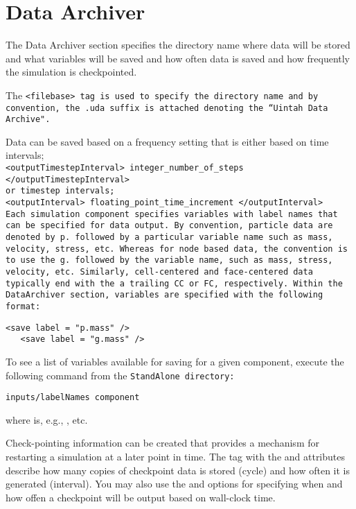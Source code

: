 \section{Data Archiver} \label{Sec:DataArchiver}

The Data Archiver section specifies the directory name where data will
be stored and what variables will be saved and how often data is saved
and how frequently the simulation is checkpointed.

The \tt <filebase> \normalfont tag is used to specify the directory
name and by convention, the \tt .uda \normalfont suffix is attached denoting the
``Uintah Data Archive".

Data can be saved based on a frequency setting that is either based on time
intervals;\\
\tt <outputTimestepInterval> integer\_number\_of\_steps </outputTimestepInterval> \normalfont\\
or timestep intervals; \\
\tt <outputInterval> floating\_point\_time\_increment </outputInterval> \normalfont\\

Each simulation component specifies variables with label names that
can be specified for data output.  By convention, particle data are
denoted by \tt p. \normalfont followed by a particular variable name
such as mass, velocity, stress, etc.  Whereas for node based data, the
convention is to use the \tt g. \normalfont followed by the variable
name, such as mass, stress, velocity, etc.  Similarly, cell-centered
and face-centered data typically end with the a trailing \tt CC \normalfont
or \tt FC, \normalfont  respectively.  Within the DataArchiver
section, variables are specified with the following format:

\begin{Verbatim}[fontsize=\footnotesize]
   <save label = "p.mass" />
   <save label = "g.mass" />
\end{Verbatim}

To see a list of
variables available for saving for a given component, execute the following
command from the \tt StandAlone \normalfont directory:

\begin{Verbatim}[fontsize=\footnotesize]
inputs/labelNames component
\end{Verbatim}
where  is, e.g., ,  etc.

Check-pointing information can be created that provides a mechanism for
restarting a simulation at a later point in time.  The 
tag with the  and  attributes describe how many
copies of checkpoint data is stored (cycle) and how often it is generated
(interval).  You may also use the  and 
options for specifying when and how offen a checkpoint will be output based
on wall-clock time.

